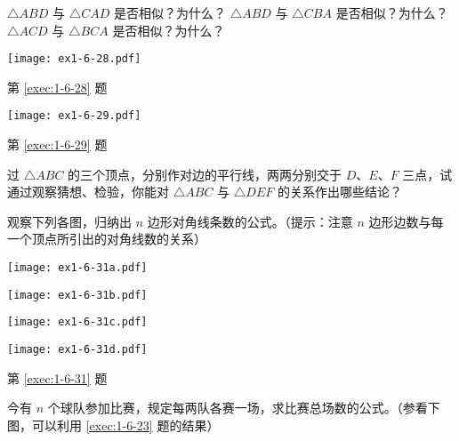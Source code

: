 \begin{Exercise}[复习题]
\begin{question}
\begin{tasks}
		\task $\triangle ABD$ 与 $\triangle CAD$ 是否相似？为什么？
		\task $\triangle ABD$ 与 $\triangle CBA$ 是否相似？为什么？
		\task $\triangle ACD$ 与 $\triangle BCA$ 是否相似？为什么？
	\end{tasks}
	\begin{figurehere}
		\begin{minipage}[b]{0.48\linewidth}
			\centering
		  \texttt{[image: ex1-6-28.pdf]}
			\caption*{第 \ref{exec:1-6-28} 题}
		\end{minipage}
		\begin{minipage}[b]{0.48\linewidth}
			\centering
			\texttt{[image: ex1-6-29.pdf]}
			\caption*{第 \ref{exec:1-6-29} 题}
		\end{minipage}
	\end{figurehere}
	\item 过 $\triangle ABC$ 的三个顶点，分别作对边的平行线，两两分别交于 $D$、$E$、$F$ 三点，试通过观察猜想、检验，你能对 $\triangle ABC$ 与 $\triangle DEF$ 的关系作出哪些结论？
	\item\label{exec:1-6-31} 观察下列各图，归纳出 $n$ 边形对角线条数的公式。（提示：注意 $n$ 边形边数与每一个顶点所引出的对角线数的关系）
	\begin{figurehere}
		\begin{minipage}{\linewidth}\centering
			\begin{minipage}{0.22\linewidth}\centering
				\texttt{[image: ex1-6-31a.pdf]}
				\subcaption{}
			\end{minipage}
			\begin{minipage}{0.22\linewidth}\centering
				\texttt{[image: ex1-6-31b.pdf]}
				\subcaption{}
			\end{minipage}
			\begin{minipage}{0.22\linewidth}\centering
				\texttt{[image: ex1-6-31c.pdf]}
				\subcaption{}
			\end{minipage}
			\begin{minipage}{0.22\linewidth}\centering
				\texttt{[image: ex1-6-31d.pdf]}
				\subcaption{}
			\end{minipage}
			\caption*{第 \ref{exec:1-6-31} 题}
		\end{minipage}
	\end{figurehere}
	\item\label{exec:1-6-32} 今有 $n$ 个球队参加比赛，规定每两队各赛一场，求比赛总场数的公式。（参看下图，可以利用 \ref{exec:1-6-23} 题的结果）
	\begin{figurehere}
		\begin{minipage}{\linewidth}\centering
			\begin{minipage}{0.22\linewidth}\centering

\end{minipage}
\end{minipage}
\end{figurehere}
\end{question}
\end{Exercise}
